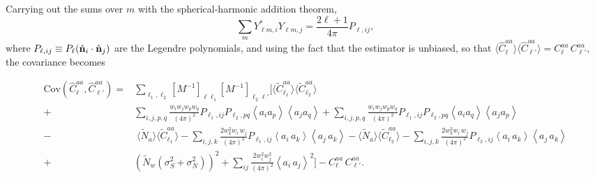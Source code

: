 \documentclass[%
 reprint,
superscriptaddress,
nofootinbib,
 amsmath,amssymb,
 aps,
 prd,
]{revtex4-2}
\newcommand{\nv}{\hat{\bf n}}
\begin{document}
Carrying out the sums over $m$ with the spherical-harmonic addition theorem,
\begin{equation}
  \sum_m Y_{\ell m, i}^* Y_{\ell m, j} =\frac{2\ell + 1}{4\pi}P_{\ell, ij},
\end{equation}
where $P_{\ell, ij} \equiv P_\ell(\nv_i \cdot \nv_j)$ are the Legendre polynomials, and using the fact that the estimator is unbiased, so that $\langle \hat{C}_\ell^{aa}\rangle\langle \hat{C}_{\ell'}^{aa}\rangle = C_\ell^{aa}\,C_{\ell'}^{aa}$, the covariance becomes
\begin{widetext}
\begin{equation} \label{eq:cov_brute_long}
\begin{split}
    \mathrm{Cov}(\hat{C}_\ell^{aa}, \hat{C}_{\ell'}^{aa}) = & \sum_{\ell_1,\ell_2} [M^{-1}]_{\ell\ell_1} [M^{-1}]_{\ell_2\ell'} \Bigg[\langle \tilde{C}_{\ell_1}^{aa} \rangle \langle\tilde{C}_{\ell_2}^{aa} \rangle
 \\ + & \sum_{i,j, p, q}  \frac{w_i w_jw_p w_q}{(4\pi)^2} P_{\ell_1, ij}   P_{\ell_2, pq} \left\langle a_i a_p \right\rangle \left\langle a_j a_q \right\rangle 
+ \sum_{i,j, p, q}  \frac{w_i w_j w_p w_q}{(4\pi)^2} P_{\ell_1, ij} P_{\ell_2, pq}
  \left\langle a_i a_q \right\rangle \left\langle a_j a_p \right\rangle\\
-&\; \langle \tilde{N}_a \rangle \langle\tilde{C}_{\ell_1}^{aa} \rangle-  \sum_{i, j, k} \frac{2 w_k^2 w_i\,w_j}{(4\pi)^2} P_{\ell_1, ij}
 \left\langle a_i\,a_k\right\rangle \left\langle a_j\,a_k\right\rangle 
- \langle \tilde{N}_a \rangle \langle\tilde{C}_{\ell_2}^{aa} \rangle-  \sum_{i, j, k} \frac{2 w_k^2 w_i\,w_j}{(4\pi)^2} P_{\ell_2, ij}
 \left\langle a_i\,a_k\right\rangle \left\langle a_j\,a_k\right\rangle \\
+& \left(\tilde{N}_{w} ( \sigma_{S}^{2} + \sigma_{N}^{2})\right)^2 +  \sum_{ij}  \frac{2 w_i^2 w_j^2 }{(4\pi)^2} \left\langle a_i\,a_j\right\rangle^{2} \Bigg]
- C_\ell^{aa}\,  C_{\ell'}^{aa}.
\end{split}
\end{equation}
\end{widetext}
 
\end{document}
